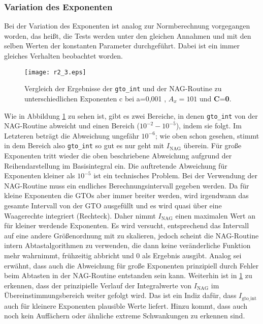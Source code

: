 \subsubsection{Variation des Exponenten}
%
Bei der Variation des Exponenten ist analog zur Normberechnung vorgegangen 
worden, das heißt, die Tests werden unter den gleichen Annahmen und mit den 
selben 
Werten der konstanten Parameter durchgeführt. Dabei ist ein immer gleiches 
Verhalten beobachtet worden. 
%
\begin{figure}[H] \centering
	\texttt{[image: r2\_3.eps]}
	\caption{Vergleich der Ergebnisse der \texttt{gto\_int} und der NAG-Routine 
	zu unterschiedlichen Exponenten c bei a=0,001 , $A_x=101$ und 
	\textbf{C}=\textbf{0}.}
	\label{pic:quad.WW_exponent} 
\end{figure}
%
Wie in Abbildung \ref{pic:quad.WW_exponent} zu sehen ist, gibt es zwei Bereiche,
in denen \texttt{gto\_int} von der NAG-Routine abweicht und einen Bereich 
($10^{-2}-10^{-5}$), indem sie folgt. Im Letzteren beträgt die Abweichung 
ungefähr $10^{-6}$; wie oben schon gesehen, stimmt in dem Bereich also 
\texttt{gto\_int} so gut es nur geht mit $I_\text{NAG}$ überein. Für große 
Exponenten tritt wieder die oben beschriebene Abweichung aufgrund der 
Reihendarstellung im Basisintegral ein. Die auftretende Abweichung für 
Exponenten kleiner als $10^{-5}$ ist ein technisches Problem. Bei der 
Verwendung der NAG-Routine muss ein endliches Berechnungsintervall gegeben 
werden. Da für kleine Exponenten die GTOs aber immer breiter werden, wird 
irgendwann das gesamte Intervall von der GTO ausgefüllt und es wird quasi über 
eine Waagerechte integriert (Rechteck). Daher nimmt $I_\text{NAG}$ einen 
maximalen Wert an für kleiner werdende Exponenten. Es wird versucht, 
entsprechend das Intervall auf eine andere Größenordnung mit zu skalieren, 
jedoch scheint die NAG-Routine intern Abtastalgorithmen zu verwenden, die dann 
keine veränderliche Funktion mehr wahrnimmt, frühzeitig abbricht und 0 als 
Ergebnis ausgibt. Analog sei erwähnt, dass auch die Abweichung für große 
Exponenten prinzipiell durch Fehler beim Abtasten in der NAG-Routine 
entstanden sein kann.   %
Weiterhin ist in \ref{pic:quad.WW_exponent} zu erkennen, dass der prinzipielle 
Verlauf der Integralwerte von $I_\text{NAG}$ im Übereinstimmungsbereich weiter 
gefolgt wird. Das ist ein Indiz dafür, dass  $I_\text{gto\_int}$ auch für 
kleinere Exponenten plausible Werte liefert. Hinzu kommt, dass auch noch kein 
Auffächern oder ähnliche extreme Schwankungen zu erkennen sind.
%
%
%
